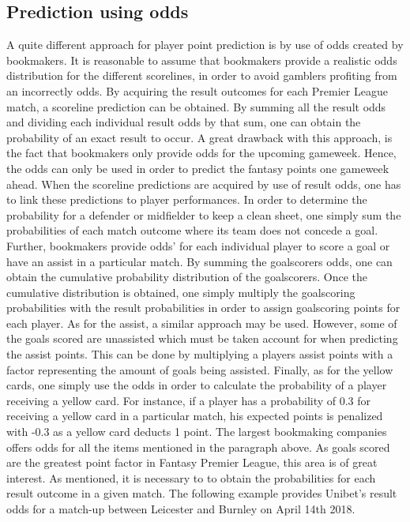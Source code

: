 \subsection{Prediction using odds}
A quite different approach for player point prediction is by use of odds created by bookmakers. It is reasonable to assume that bookmakers provide a realistic odds distribution for the different scorelines, in order to avoid gamblers profiting from an incorrectly odds. By acquiring the result outcomes for each Premier League match, a scoreline prediction can be obtained. By summing all the result odds and dividing each individual result odds by that sum, one can obtain the probability of an exact result to occur. A great drawback with this approach, is the fact that bookmakers only provide odds for the upcoming gameweek. Hence, the odds can only be used in order to predict the fantasy points one gameweek ahead. 
\newpar
When the scoreline predictions are acquired by use of result odds, one has to link these predictions to player performances. In order to determine the probability for a defender or midfielder to keep a clean sheet, one simply sum the probabilities of each match outcome where its team does not concede a goal. Further, bookmakers provide odds' for each individual player to score a goal or have an assist in a particular match. By summing the goalscorers odds, one can obtain the cumulative probability distribution of the goalscorers. Once the cumulative distribution is obtained, one simply multiply the goalscoring probabilities with the result probabilities in order to assign goalscoring points for each player. As for the assist, a similar approach may be used. However, some of the goals scored are unassisted which must be taken account for when predicting the assist points. This can be done by multiplying a players assist points with a factor representing the amount of goals being assisted. Finally, as for the yellow cards, one simply use the odds in order to calculate the probability of a player receiving a yellow card. For instance, if a player has a probability of 0.3 for receiving a yellow card in a particular match, his expected points is penalized with -0.3 as a yellow card deducts 1 point. 
\newpar
The largest bookmaking companies offers odds for all the items mentioned in the paragraph above. As goals scored are the greatest point factor in Fantasy Premier League, this area is of great interest. As mentioned, it is necessary to to obtain the probabilities for each result outcome in a given match. The following example provides Unibet's result odds for a match-up between Leicester and Burnley on April 14th 2018. 

